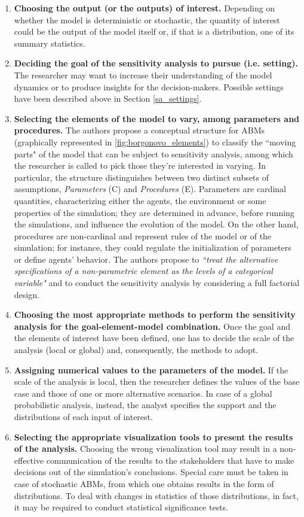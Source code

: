 \begin{enumerate}
    \item \textbf{Choosing the output (or the outputs) of interest.} Depending on whether the model is deterministic or stochastic, the quantity of interest could be the output of the model itself or, if that is a distribution, one of its summary statistics. 
    \item \textbf{Deciding the goal of the sensitivity analysis to pursue (i.e. setting).} The researcher may want to increase their understanding of the model dynamics or to produce insights for the decision-makers. Possible settings have been described above in Section \ref{sa_settings}.
    \item \textbf{Selecting the elements of the model to vary, among parameters and procedures.} The authors propose a conceptual structure for ABMs (graphically represented in \ref{fig:borgonovo_elements}) to classify the ``moving parts" of the model that can be subject to sensitivity analysis, among which the researcher is called to pick those they're interested in varying. In particular, the structure distinguishes between two distinct subsets of assumptions, \textit{Parameters} (C) and \textit{Procedures} (E). Parameters are cardinal quantities, characterizing either the agents, the environment or some properties of the simulation; they are determined in advance, before running the simulations, and influence the evolution of the model. On the other hand, procedures are non-cardinal and represent rules of the model or of the simulation; for instance, they could regulate the initialization of parameters or define agents' behavior. The authors propose to \textit{``treat the alternative specifications of a non-parametric element as the levels of a categorical variable"} and to conduct the sensitivity analysis by considering a full factorial design. 
    \item \textbf{Choosing the most appropriate methods to perform the sensitivity analysis for the goal-element-model combination.} Once the goal and the elements of interest have been defined, one has to decide the scale of the analysis (local or global) and, consequently, the methods to adopt. 
    \item \textbf{Assigning numerical values to the parameters of the model.} If the scale of the analysis is local, then the researcher defines the values of the base case and those of one or more alternative scenarios. In case of a global probabilistic analysis, instead, the analyst specifies the support and the distributions of each input of interest.
    \item \textbf{Selecting the appropriate visualization tools to present the results of the analysis.} Choosing the wrong visualization tool may result in a non-effective communication of the results to the stakeholders that have to make decisions out of the simulation's conclusions. Special care must be taken in case of stochastic ABMs, from which one obtains results in the form of distributions. To deal with changes in statistics of those distributions, in fact, it may be required to conduct statistical significance tests.
\end{enumerate}


